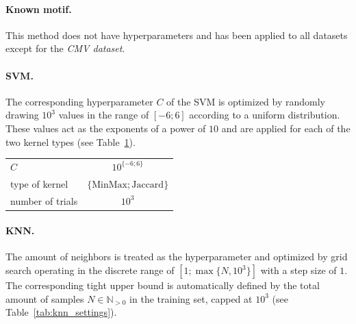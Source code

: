 \documentclass[oneside]{book}
\begin{document}
\paragraph{Known motif.}
This method does not have hyperparameters and has been applied 
to all datasets except for the \emph{CMV dataset}. 

\paragraph{SVM.}
The corresponding hyperparameter $C$ of the SVM is optimized by randomly 
drawing $10^{3}$ values in the range of $[-6; 6]$ 
according to a uniform distribution. These values act 
as the exponents of a power of $10$ and are applied 
for each of the two kernel types (see Table~\ref{tab:svm_settings}).

\begin{table}[htp]%
    \begin{center}%
        \begin{tabular}{lc}%
            \toprule
            $C$ & $10^{\{-6;6\}}$ \\
            type of kernel & $\{\mathrm{MinMax}; \mathrm{Jaccard}\}$ \\
            number of trials & $10^{3}$ \\
            \bottomrule
        \end{tabular}%
        \label{tab:svm_settings}%
    \end{center}%
\end{table}

\paragraph{KNN.}
The amount of neighbors is treated as the hyperparameter and optimized by grid search operating in the discrete range of $[1; \max\{N, 10^{3}\}]$ with a step size of $1$. The corresponding tight upper bound is automatically defined by the total amount of samples $N\in\mathbb{N}_{> 0}$ in the training set, capped at $10^{3}$ (see Table~\ref{tab:knn_settings}).
\end{document}
